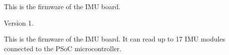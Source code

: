 This is the firmware of the I\+MU board. \begin{DoxyVersion}{Version}
1.
\end{DoxyVersion}
This is the firmware of the I\+MU board. It can read up to 17 I\+MU modules connected to the P\+SoC microcontroller. 